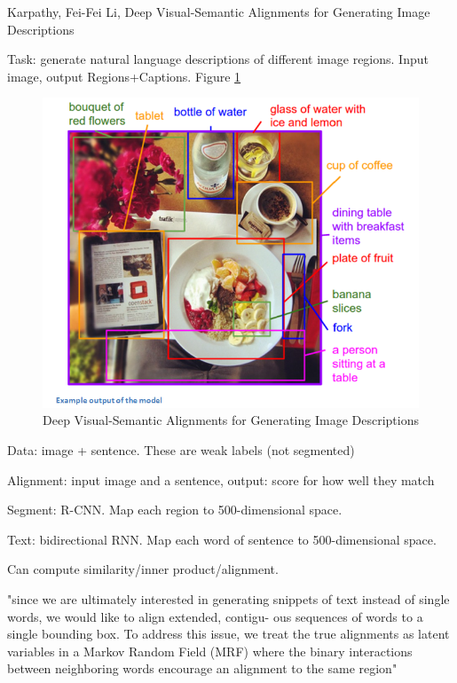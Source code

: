 \documentclass[english]{article}
\begin{document}
\item 
Karpathy, Fei-Fei Li, Deep Visual-Semantic Alignments for Generating Image Descriptions
\benum 
\item Task: generate natural language descriptions of different image regions. Input image, output Regions+Captions. Figure \ref{Caption}

\begin{figure}
  \centering
  \includegraphics[scale=0.5]{Caption.png}
    \caption{Deep Visual-Semantic Alignments for Generating Image Descriptions}
    \label{Caption}
\end{figure}

\item Data:  image + sentence. These are weak labels (not segmented)

\item Alignment: input image and a sentence, output: score for how well they match

Segment: R-CNN. Map each region to 500-dimensional space.

Text: bidirectional RNN. Map each word of sentence to 500-dimensional space. 

Can compute similarity/inner product/alignment.

"since we are
ultimately interested in generating snippets of text instead
of single words, we would like to align extended, contigu-
ous sequences of words to a single bounding box.
To address this issue, we treat the true alignments as latent
variables in a Markov Random Field (MRF) where the binary interactions between neighboring words encourage an alignment to the same region"
\end{document}
